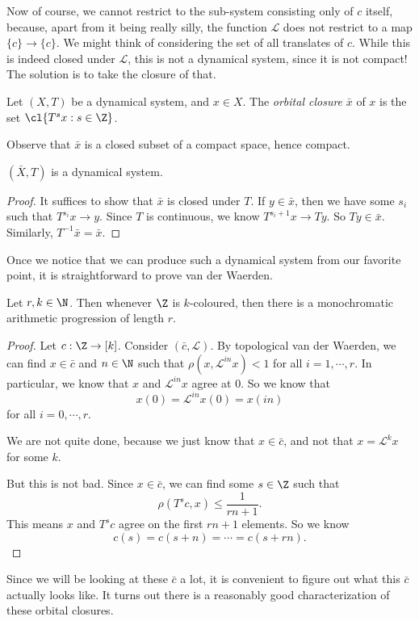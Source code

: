 \documentclass[a4paper]{article}
\begin{document}
Now of course, we cannot restrict to the sub-system consisting only of $c$ itself, because, apart from it being really silly, the function $\mathcal{L}$ does not restrict to a map $\{c\} \to \{c\}$. We might think of considering the set of all translates of $c$. While this is indeed closed under $\mathcal{L}$, this is not a dynamical system, since it is not compact! The solution is to take the closure of that.

\begin{defi}
  Let $(X, T)$ be a dynamical system, and $x \in X$. The \emph{orbital closure} $\bar{x}$ of $x$ is the set $\cl \{T^s x: s \in \Z\}$.
\end{defi}
Observe that $\bar{x}$ is a closed subset of a compact space, hence compact.

\begin{prop}
  $(\bar{X}, T)$ is a dynamical system.
\end{prop}

\begin{proof}
  It suffices to show that $\bar{x}$ is closed under $T$. If $y \in \bar{x}$, then we have some $s_i$ such that $T^{s_i}x \to y$. Since $T$ is continuous, we know $T^{s_i + 1}x \to T y$. So $T y \in \bar{x}$. Similarly, $T^{-1}\bar{x} = \bar{x}$.
\end{proof}

Once we notice that we can produce such a dynamical system from our favorite point, it is straightforward to prove van der Waerden.
\begin{cor}
  Let $r, k \in \N$. Then whenever $\Z$ is $k$-coloured, then there is a monochromatic arithmetic progression of length $r$.
\end{cor}

\begin{proof}
  Let $c: \Z \to [k]$. Consider $(\bar{c}, \mathcal{L})$. By topological van der Waerden, we can find $x \in \bar{c}$ and $n \in \N$ such that $\rho(x, \mathcal{L}^{in} x) < 1$ for all $i = 1, \cdots, r$. In particular, we know that $x$ and $\mathcal{L}^{in} x$ agree at $0$. So we know that
  \[
    x(0) = \mathcal{L}^{in} x(0) = x(in)
  \]
  for all $i = 0, \cdots, r$.

  We are not quite done, because we just know that $x \in \bar{c}$, and not that $x = \mathcal{L}^k x$ for some $k$.

  But this is not bad. Since $x \in \bar{c}$, we can find some $s \in \Z$ such that
  \[
    \rho(T^s c, x) \leq \frac{1}{rn + 1}.
  \]
  This means $x$ and $T^s c$ agree on the first $rn + 1$ elements. So we know
  \[
    c(s) = c(s + n) = \cdots = c(s + rn).
  \]
\end{proof}
Since we will be looking at these $\bar{c}$ a lot, it is convenient to figure out what this $\bar{c}$ actually looks like. It turns out there is a reasonably good characterization of these orbital closures.
\end{document}
